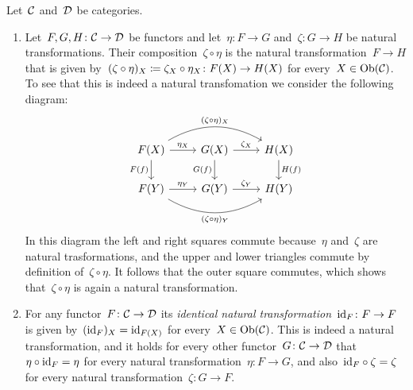 \begin{remark}
  Let~$\mathcal{C}$ and~$\mathcal{D}$ be categories.
  \begin{enumerate}
    \item
      Let~$F, G, H \colon \mathcal{C} \to \mathcal{D}$ be functors and let~$\eta \colon F \to G$ and~$\zeta \colon G \to H$ be natural transformations.
      Their composition~$\zeta \circ \eta$ is the natural transformation~$F \to H$ that is given by~$(\zeta \circ \eta)_X \coloneqq \zeta_X \circ \eta_X \colon F(X) \to H(X)$ for every~$X \in \operatorname{Ob}(\mathcal{C})$.
      To see that this is indeed a natural transfomation we consider the following diagram:
      \[
        \begin{tikzcd}
            F(X)
            \arrow[bend left]{rr}[above]{(\zeta \circ \eta)_X}
            \arrow{r}[above]{\eta_X}
            \arrow{d}[left]{F(f)}
          & G(X)
            \arrow{r}[above]{\zeta_X}
            \arrow{d}[left]{G(f)}
          & H(X)
            \arrow{d}[right]{H(f)}
          \\
            F(Y)
            \arrow{r}[above]{\eta_Y}
            \arrow[bend right]{rr}[below]{(\zeta \circ \eta)_Y}
          & G(Y)
            \arrow{r}[above]{\zeta_Y}
          & H(Y)
        \end{tikzcd}
      \]
      In this diagram the left and right squares commute because~$\eta$ and~$\zeta$ are natural trasformations, and the upper and lower triangles commute by definition of~$\zeta \circ \eta$.
      It follows that the outer square commutes, which shows that~$\zeta \circ \eta$ is again a natural transformation.
    \item
      For any functor~$F \colon \mathcal{C} \to \mathcal{D}$ its \emph{identical natural transformation}~$\operatorname{id}_F \colon F \to F$ is given by~$(\operatorname{id}_F)_X = \operatorname{id}_{F(X)}$ for every~$X \in \operatorname{Ob}(\mathcal{C})$.
      This is indeed a natural transformation, and it holds for every other functor~$G \colon \mathcal{C} \to \mathcal{D}$ that~$\eta \circ {\operatorname{id}_F} = \eta$ for every natural transformation~$\eta \colon F \to G$, and also~${\operatorname{id}_F} \circ \zeta = \zeta$ for every natural transformation~$\zeta \colon G \to F$.
  \end{enumerate}
\end{remark}


